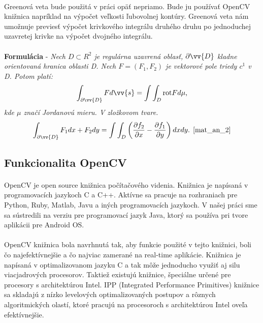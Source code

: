 \documentclass[12pt]{article}
\begin{document}
\paragraph{}
Greenová veta bude použitá v práci opäť nepriamo. Bude ju používať OpenCV knižnica napríklad na výpočet veľkosti ľubovolnej kontúry. Greenová veta nám umožnuje previesť výpočet krivkového integrálu druhého druhu po jednoduchej uzavretej krivke na výpočet dvojného integrálu.
\cite{mat_an_2}	\\ \\
	  	\textbf{Formulácia} - \emph{Nech \begin{math}D \subset R^2 \end{math} je regulárna uzavrená oblasť, \begin{math}\partial \vv{D} \end{math} kladne orientovaná hranica oblasti D. Nech \begin{math} F = (F_1,F_2) \end{math} je vektorové  pole triedy \begin{math} c^1 \end{math} v D. Potom platí:}
	  	\begin{align*}
		\int_{\partial \vv{D}} F d\vv{s} = \int\int_{D} \text{rot} F d \mu \text{,}
		\end{align*}
		\emph{kde \begin{math} \mu \end{math} značí Jordanovú mieru. V zložkovom tvare.} 
		\begin{align*}
		\int_{\partial \vv{D}} F_1 d x + F_2 d y = \int\int_{D} \left ( \frac{\partial f_2}{\partial x} - \frac{\partial f_1}{\partial y} \right ) dxdy \text{. \cite{mat_an_2}}
		\end{align*}
\subsection{Funkcionalita OpenCV}
\paragraph{}
OpenCV je open source knižnica počítačového videnia. Knižnica je napísaná v programovacích jazykoch C a C++. Aktívne sa pracuje na
rozhraniach pre Python, Ruby, Matlab, Javu a iných programovacích jazykoch. V našej práci sme sa sústredili na verziu pre programovací jazyk Java,
ktorý sa používa pri tvore aplikácii pre Android OS.
\cite{learning_opencv}
\paragraph{}
OpenCV knižnica bola navrhnutá tak, aby funkcie použité v tejto knižnici, boli čo najefektívnejšie a čo najviac zamerané na real-time aplikácie.
Knižnica je napísaná v optimalizovanom jazyku C a tak môže jednoducho využiť aj silu viacjadrových procesorov.
Taktiež existujú knižnice, špeciálne určené pre procesory s architektúrou Intel. IPP (Integrated Performance Primitives) knižnice  sa skladajú z nízko levelových 
optimalizovaných postupov a rôznych algoritmických olastí, ktoré pracujú na procesoroch s architektúrou Intel oveľa efektívnejšie.
\cite{learning_opencv}
\end{document}
